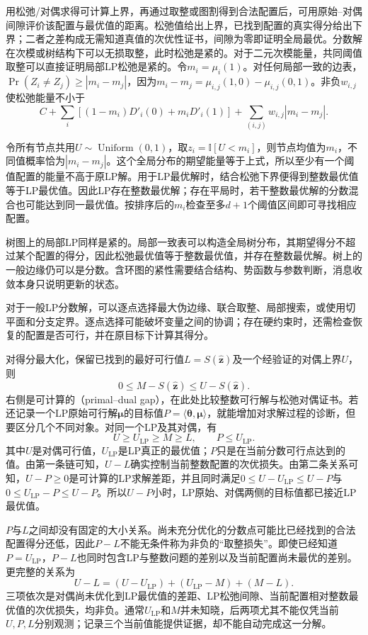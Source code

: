 用松弛/对偶求得可计算上界，再通过取整或图割得到合法配置后，可用原始--对偶间隙评价该配置与最优值的距离。松弛值给出上界，已找到配置的真实得分给出下界；二者之差构成无需知道真值的次优性证书，间隙为零即证明全局最优。分数解在次模或树结构下可以无损取整，此时松弛是紧的。对于二元次模能量，共同阈值取整可以直接证明局部LP松弛是紧的。令$m_i=\mu_i(1)$。对任何局部一致的边表，$\Pr(Z_i\ne Z_j)\geq|m_i-m_j|$，因为$m_i-m_j=\mu_{i,j}(1,0)-\mu_{i,j}(0,1)$。非负$w_{i,j}$使松弛能量不小于
\[
  C+\sum_i[(1-m_i)D'_i(0)+m_iD'_i(1)]
       +\sum_{(i,j)}w_{i,j}|m_i-m_j|.
\]

令所有节点共用$U\sim\operatorname{Uniform}(0,1)$，取$z_i=\mathbb I[U<m_i]$，则节点均值为$m_i$，不同值概率恰为$|m_i-m_j|$。这个全局分布的期望能量等于上式，所以至少有一个阈值配置的能量不高于原LP解。用于LP最优解时，结合松弛下界便得到整数最优值等于LP最优值。因此LP存在整数最优解；存在平局时，若干整数最优解的分数混合也可能达到同一最优值。按排序后的$m_i$检查至多$d+1$个阈值区间即可寻找相应配置。

树图上的局部LP同样是紧的。局部一致表可以构造全局树分布，其期望得分不超过某个配置的得分，因此松弛最优值等于整数最优值，并存在整数最优解。树上的一般边缘仍可以是分数。含环图的紧性需要结合结构、势函数与参数判断，消息收敛本身只说明更新的状态。

对于一般LP分数解，可以逐点选择最大伪边缘、联合取整、局部搜索，或使用切平面和分支定界。逐点选择可能破坏变量之间的协调；存在硬约束时，还需检查恢复的配置是否可行，并在原目标下计算其得分。

对得分最大化，保留已找到的最好可行值$L=S(\widehat{\bm z})$及一个经验证的对偶上界$U$，则
\begin{equation}
  0\leq M-S(\widehat{\bm z})\leq U-S(\widehat{\bm z}).
  \label{eq:pgm-variational-gap}
\end{equation}
右侧是可计算的（primal--dual gap），在此处比较整数可行解与松弛对偶证书。若还记录一个LP原始可行解$\bm\mu$的目标值$P=\langle\bm\theta,\bm\mu\rangle$，就能增加对求解过程的诊断，但要区分几个不同对象。对同一个LP及其对偶，有
\[
  U\geq U_{\mathrm{LP}}\geq M\geq L,
  \qquad P\leq U_{\mathrm{LP}}.
\]
其中$U$是对偶可行值，$U_{\mathrm{LP}}$是LP真正的最优值；$P$只是在当前分数可行点达到的值。由第一条链可知，$U-L$确实控制当前整数配置的次优损失。由第二条关系可知，$U-P\geq0$是可计算的LP求解差距，并且同时满足$0\leq U-U_{\mathrm{LP}}\leq U-P$与$0\leq U_{\mathrm{LP}}-P\leq U-P$。所以$U-P$小时，LP原始、对偶两侧的目标值都已接近LP最优值。

$P$与$L$之间却没有固定的大小关系。尚未充分优化的分数点可能比已经找到的合法配置得分还低，因此$P-L$不能无条件称为非负的“取整损失”。即使已经知道$P=U_{\mathrm{LP}}$，$P-L$也同时包含LP与整数问题的差别以及当前配置尚未最优的差别。更完整的关系为
\[
  U-L
    =(U-U_{\mathrm{LP}})
       +(U_{\mathrm{LP}}-M)+(M-L).
\]
三项依次是对偶尚未优化到LP最优值的差距、LP松弛间隙、当前配置相对整数最优值的次优损失，均非负。通常$U_{\mathrm{LP}}$和$M$并未知晓，后两项尤其不能仅凭当前$U,P,L$分别观测；记录三个当前值能提供证据，却不能自动完成这一分解。

